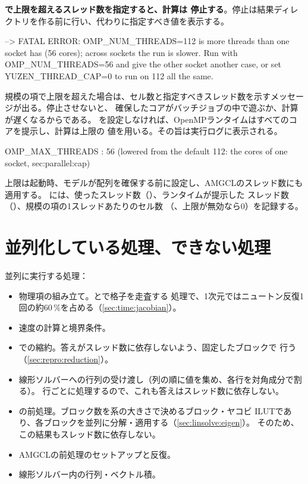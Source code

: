 \textbf{で上限を超えるスレッド数を指定すると、計算は
停止する}。停止は結果ディレクトリを作る前に行い、代わりに指定すべき値を表示する。
\begin{shell}
--> FATAL ERROR: OMP_NUM_THREADS=112 is more threads than one socket has (56 cores); across sockets the run is slower. Run with OMP_NUM_THREADS=56 and give the other socket another case, or set YUZEN_THREAD_CAP=0 to run on 112 all the same.
\end{shell}
規模の項で上限を超えた場合は、セル数と指定すべきスレッド数を示すメッセージが出る。停止させないと、
確保したコアがバッチジョブの中で遊ぶか、計算が遅くなるからである。
を設定しなければ、OpenMPランタイムはすべてのコアを提示し、計算は上限の
値を用いる。その旨は実行ログに表示される。
\begin{shell}
 OMP_MAX_THREADS : 56 (lowered from the default 112: the cores of one socket, sec:parallel:cap)
\end{shell}
上限は起動時、モデルが配列を確保する前に設定し、AMGCLのスレッド数にも適用する。
には、使ったスレッド数（）、ランタイムが提示した
スレッド数（）、規模の項の1スレッドあたりのセル数
（、上限が無効なら0）を記録する。

\section{並列化している処理、できない処理}
\label{sec:parallel:what}

並列に実行する処理：

\begin{itemize}
  \item 物理項の組み立て。とで格子を走査する
    処理で、1次元ではニュートン反復1回の約60\,\%を占める（\cref{sec:time:jacobian}）。
  \item 速度の計算と境界条件。
  \item {}での縮約。答えがスレッド数に依存しないよう、固定したブロックで
    行う（\cref{sec:repro:reduction}）。
  \item 線形ソルバーへの行列の受け渡し（列の順に値を集め、各行を対角成分で割る）。
    行ごとに処理するので、これも答えはスレッド数に依存しない。
  \item {}の前処理。ブロック数を系の大きさで決めるブロック・ヤコビ
    ILUTであり、各ブロックを並列に分解・適用する（\cref{sec:linsolve:eigen}）。
    そのため、この結果もスレッド数に依存しない。
  \item AMGCLの前処理のセットアップと反復。
  \item 線形ソルバー内の行列・ベクトル積。
\end{itemize}

